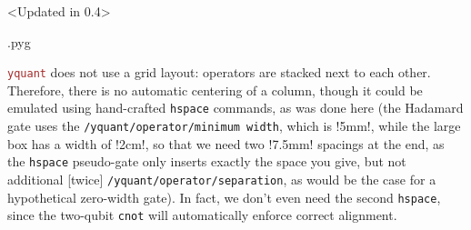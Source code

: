 \documentclass{scrartcl}
\makeatletter
\newenvironment{codeexample}{%
   \VerbatimEnvironment%
   \let\FVB@VerbatimOut\minted@FVB@VerbatimOut
   \let\FVE@VerbatimOut\minted@FVE@VerbatimOut
   \minted@configlang{tex}%
   \minted@fvset
   \begin{VerbatimOut}[codes={\catcode`\^^I=12},firstline,lastline]{\minted@jobname.pyg}%
}{
   \end{VerbatimOut}%
   \minted@langlinenoson%
   \savebox\codeexamplebox{ \minted@jobname.pyg}%
   \ifdim\wd\codeexamplebox>\dimexpr.5\linewidth-3mm\relax%
      \wd\codeexamplebox=.5\linewidth%
   \else%
      \wd\codeexamplebox=\dimexpr\wd\codeexamplebox+3mm\relax%
   \fi%
   \noindent\begin{minipage}{\wd\codeexamplebox}%
      \centering%
      \usebox\codeexamplebox%
   \end{minipage}%
   \begin{minipage}{\dimexpr\linewidth-\wd\codeexamplebox\relax}%
      \expandafter\minted@pygmentize\expandafter{\minted@lang}%
   \end{minipage}%
   \minted@langlinenosoff%
   \par%
}
\def\pkg#1{\textcolor{brown}{\texttt{#1}}}
\def\ttlink{\link\texttt}
\def\Yquant{\pkg{yquant}}
\makeatother
\begin{document}
            \begin{example}<Updated in 0.4>
               \begin{codeexample}
               \end{codeexample}
               \Yquant{} does not use a grid layout: operators are stacked next to each other.
               Therefore, there is no automatic centering of a column, though it could be emulated using hand-crafted \ttlink{hspace} commands, as was done here (the Hadamard gate uses the \ttlink{/yquant/operator/minimum width}, which is \tex!5mm!, while the large box has a width of \tex!2cm!, so that we need two \tex!7.5mm! spacings at the end, as the \ttlink{hspace} pseudo\hyp gate only inserts exactly the space you give, but not additional [twice] \ttlink{/yquant/operator/separation}, as would be the case for a hypothetical zero\hyp width gate).
               In fact, we don't even need the second \ttlink{hspace}, since the two\hyp qubit \ttlink{cnot} will automatically enforce correct alignment.
            \end{example}
\end{document}
